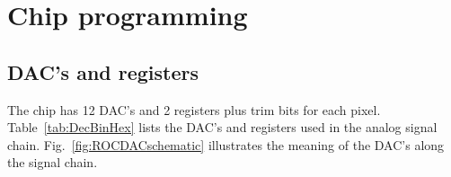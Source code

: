 \chapter{Chip programming}
\section{DAC's and registers}

The chip has 12 DAC's and 2 registers plus trim bits for each pixel. Table~\ref{tab:DecBinHex} lists the DAC's and registers used in the analog signal chain. Fig.~\ref{fig:ROCDACschematic} illustrates the meaning of the DAC's along the signal chain.

